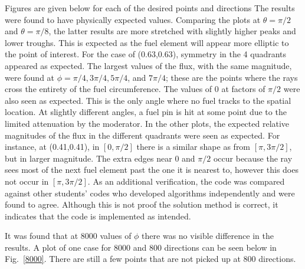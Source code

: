 \documentclass[12pt]{article}
\newenvironment{solution}[1][Solution]{\begin{trivlist}
\item[\hskip \labelsep {\bfseries #1} {\hspace{-0.2em}\bfseries:}]\hspace{0.3in}\newline}{\end{trivlist}}
\begin{document}
\begin{solution}
Figures are given below for each of the desired points and directions
The results were found to have physically expected values. Comparing the plots at
$\theta=\pi/2$ and $\theta=\pi/8$, the latter results are more stretched with
slightly higher peaks and lower troughs.  This is expected as the fuel element will
appear more elliptic to the point of interest.  For the case of (0.63,0.63), symmetry
in the 4 quadrants appeared as expected. The largest values of
the flux, with the same magnitude, were found at $\phi=\pi/4,3\pi/4,5\pi/4$, and
$7\pi/4$; these are the points where the rays cross the entirety of the fuel
circumference.  The values of 0 at factors of $\pi/2$ were also seen as expected. This is
the only angle where no fuel tracks to the spatial location. At slightly different angles, a fuel pin is
hit at some point due to the limited attenuation by the moderator. In the other
plots, the expected relative magnitudes of the flux in the different quadrants were
seen as expected.  For instance, at (0.41,0.41), in $[0,\pi/2]$ there is a
similar shape as from $[\pi,3\pi/2]$, but in larger magnitude. The extra edges near
$0$ and $\pi/2$ occur because the ray sees most of the next fuel element past the one
it is nearest to, however this does not occur in $[\pi,3\pi/2]$.
As an additional verification, the code was compared against other students' codes who developed
algorithms independently and were found to agree.  Although this is not proof the
solution method is correct, it indicates that the code is implemented as intended.

It was found that at 8000 values of $\phi$ there was no visible difference in the
results.  A plot of one case for 8000 and 800 directions can be seen below in
Fig.~\ref{8000}. There are still a few points that are not picked up at 800
directions.  


\end{solution}
\end{document}
